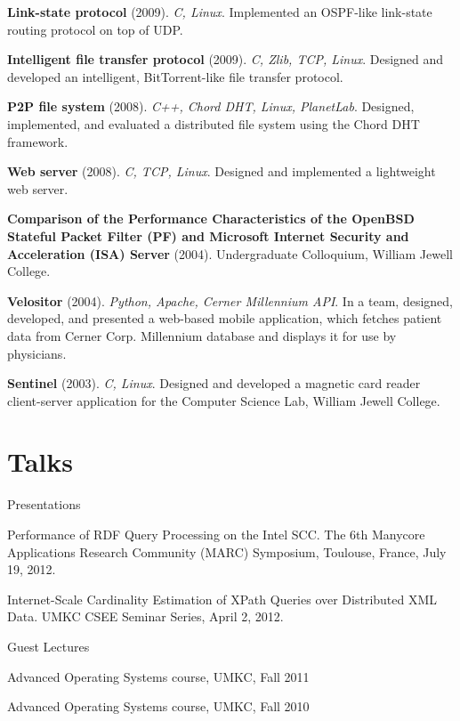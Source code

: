 \documentclass[margin,line]{resume}
\begin{document}
\begin{resume}
\vspace{-2mm}
    \textbf{Link-state protocol} (2009). \textsl{C, Linux}. Implemented an OSPF-like link-state routing protocol on top of UDP.

\vspace{-2mm}
    \textbf{Intelligent file transfer protocol} (2009). \textsl{C, Zlib, TCP, Linux}. Designed and developed an intelligent, BitTorrent-like file transfer protocol.

\vspace{-2mm}
    \textbf{P2P file system} (2008). \textsl{C++, Chord DHT, Linux, PlanetLab}. Designed, implemented, and evaluated a distributed file system using the Chord DHT framework.

\vspace{-2mm}
    \textbf{Web server} (2008). \textsl{C, TCP, Linux}. Designed and implemented a lightweight web server.
    
\vspace{-2mm}
    \textbf{Comparison of the Performance Characteristics of the OpenBSD Stateful Packet Filter (PF) and Microsoft Internet Security and Acceleration (ISA) Server} (2004). Undergraduate Colloquium, William Jewell College.

\vspace{-2mm}    
    \textbf{Velositor} (2004). \textsl{Python, Apache, Cerner Millennium API}. In a team, designed, developed, and presented a web-based mobile application, which fetches patient data from Cerner Corp. Millennium database and displays it for use by physicians.

\vspace{-2mm}
    \textbf{Sentinel} (2003). \textsl{C, Linux}. Designed and developed a magnetic card reader client-server application for the Computer Science Lab, William Jewell College.
    
    \section{\mysidestyle Talks}
    \begin{list2}
    \item Presentations
    \begin{list3}
    \item Performance of RDF Query Processing on the Intel SCC. The 6th Manycore Applications Research Community (MARC) Symposium, Toulouse, France, July 19, 2012.
    \item Internet-Scale Cardinality Estimation of XPath Queries over Distributed XML Data. UMKC CSEE Seminar Series, April 2, 2012.
    \end{list3}
    \item Guest Lectures
    \begin{list3}
    \item Advanced Operating Systems course, UMKC, Fall 2011
    \item Advanced Operating Systems course, UMKC, Fall 2010
    \end{list3}
    \end{list2}


\end{resume}
\end{document}
